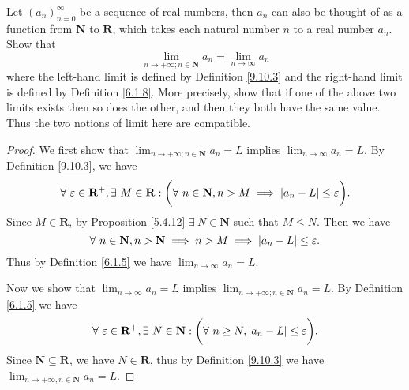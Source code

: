 \exercisesection

\begin{exercise}\label{ex 9.10.1}
    Let \((a_n)_{n = 0}^\infty\) be a sequence of real numbers, then \(a_n\) can also be thought of as a function from \(\mathbf{N}\) to \(\mathbf{R}\), which takes each natural number \(n\) to a real number \(a_n\).
    Show that
    \[
        \lim_{n \to +\infty ; n \in \mathbf{N}} a_n = \lim_{n \to \infty} a_n
    \]
    where the left-hand limit is defined by Definition \ref{9.10.3} and the right-hand limit is defined by Definition \ref{6.1.8}.
    More precisely, show that if one of the above two limits exists then so does the other, and then they both have the same value.
    Thus the two notions of limit here are compatible.
\end{exercise}

\begin{proof}
    We first show that \(\lim_{n \to +\infty ; n \in \mathbf{N}} a_n = L\) implies \(\lim_{n \to \infty} a_n = L\).
    By Definition \ref{9.10.3}, we have
    \[
        \forall\ \varepsilon \in \mathbf{R}^+, \exists\ M \in \mathbf{R} : \bigg(\forall\ n \in \mathbf{N}, n > M \implies \abs*{a_n - L} \leq \varepsilon\bigg).
    \]
    Since \(M \in \mathbf{R}\), by Proposition \ref{5.4.12} \(\exists\ N \in \mathbf{N}\) such that \(M \leq N\).
    Then we have
    \[
        \forall\ n \in \mathbf{N}, n > \mathbf{N} \implies n > M \implies \abs*{a_n - L} \leq \varepsilon.
    \]
    Thus by Definition \ref{6.1.5} we have \(\lim_{n \to \infty} a_n = L\).

    Now we show that \(\lim_{n \to \infty} a_n = L\) implies \(\lim_{n \to +\infty ; n \in \mathbf{N}} a_n = L\).
    By Definition \ref{6.1.5} we have
    \[
        \forall\ \varepsilon \in \mathbf{R}^+, \exists\ N \in \mathbf{N} : \bigg(\forall\ n \geq N, \abs*{a_n - L} \leq \varepsilon\bigg).
    \]
    Since \(\mathbf{N} \subseteq \mathbf{R}\), we have \(N \in \mathbf{R}\), thus by Definition \ref{9.10.3} we have \(\lim_{n \to +\infty, n \in \mathbf{N}} a_n = L\).
\end{proof}